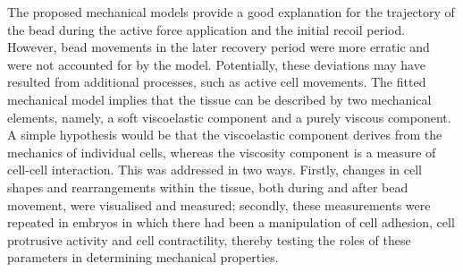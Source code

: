 The proposed mechanical models provide a good explanation for the trajectory of the bead during the active force application and the initial recoil period. However, bead movements in the later recovery period were more erratic and were not accounted for by the model.
Potentially, these deviations may have resulted from additional processes, such as active cell movements.
The fitted mechanical model implies that the tissue can be described by two mechanical elements, namely, a soft viscoelastic component and a purely viscous component.
A simple hypothesis would be that the viscoelastic component derives from the mechanics of individual cells, whereas the viscosity component is a measure of cell-cell interaction.
This was addressed in two ways.
Firstly, changes in cell shapes and rearrangements within the tissue, both during and after bead movement, were visualised and measured;
secondly, these measurements were repeated in embryos in which there had been a manipulation of cell adhesion, cell protrusive activity and cell contractility, thereby testing the roles of these parameters in determining mechanical properties.


